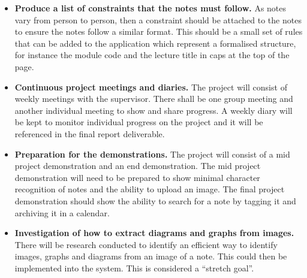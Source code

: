 \documentclass[11pt,fleqn,twoside]{article}
\begin{document}
\begin{itemize}
\begin{itemize}
  \end{itemize}

\item \textbf{Produce a list of constraints that the notes must follow.} As notes vary from person to person, then a constraint should be attached to the notes to ensure the notes follow a similar format. This should be a small set of rules that can be added to the application which represent a formalised structure, for instance the module code and the lecture title in caps at the top of the page.

\item \textbf{Continuous project meetings and diaries.} The project will consist of weekly meetings with the supervisor. There shall be one group meeting and another individual meeting to show and share progress. A weekly diary will be kept to monitor individual progress on the project and it will be referenced in the final report deliverable.

\item \textbf{Preparation for the demonstrations.} The project will consist of a mid project demonstration and an end demonstration. The mid project demonstration will need to be prepared to show minimal character recognition of notes and the ability to upload an image. The final project demonstration should show the ability to search for a note by tagging it and archiving it in a calendar.

\item \textbf{Investigation of how to extract diagrams and graphs from images.} There will be research conducted to identify an efficient way to identify images, graphs and diagrams from an image of a note. This could then be implemented into the system. This is considered a ``stretch goal''.

\end{itemize}

\end{document}
